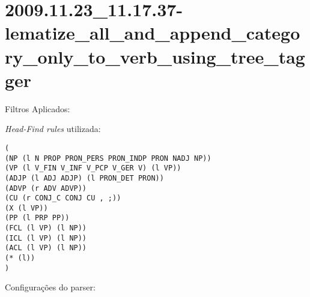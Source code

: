 \section{2009.11.23_11.17.37-lematize_all_and_append_category_only_to_verb_using_tree_tagger} %
\label{sec:exp:2009.11.23_11.17.37-lematize_all_and_append_category_only_to_verb_using_tree_tagger}

Filtros Aplicados:

\begin{itemize}
  
  \item{\emph{LematizeAllAndAppendCategoryOnlyToVerbUsingTreeTagger}
  
\end{itemize}

\emph{Head-Find rules} utilizada:

\scriptsize
\begin{verbatim}
(
(NP (l N PROP PRON_PERS PRON_INDP PRON NADJ NP))
(VP (l V_FIN V_INF V_PCP V_GER V) (l VP))
(ADJP (l ADJ ADJP) (l PRON_DET PRON))
(ADVP (r ADV ADVP))
(CU (r CONJ_C CONJ CU , ;))
(X (l VP))
(PP (l PRP PP))
(FCL (l VP) (l NP))
(ICL (l VP) (l NP))
(ACL (l VP) (l NP))
(* (l))
)

\end{verbatim}

\normalsize

Configurações do parser:

